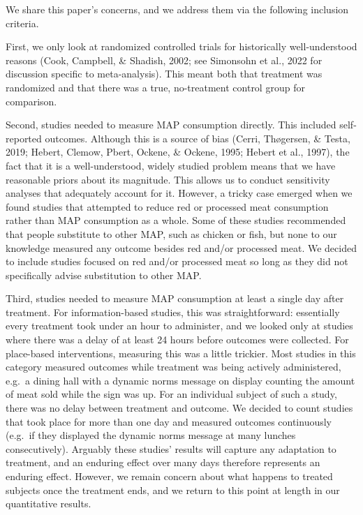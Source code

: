 \documentclass[
  man]{apa6}
\begin{document}
We share this paper's concerns, and we address them via the following inclusion criteria.

First, we only look at randomized controlled trials for historically well-understood reasons (Cook, Campbell, \& Shadish, 2002; see Simonsohn et al., 2022 for discussion specific to meta-analysis). This meant both that treatment was randomized and that there was a true, no-treatment control group for comparison.

Second, studies needed to measure MAP consumption directly. This included self-reported outcomes. Although this is a source of bias (Cerri, Thøgersen, \& Testa, 2019; Hebert, Clemow, Pbert, Ockene, \& Ockene, 1995; Hebert et al., 1997), the fact that it is a well-understood, widely studied problem means that we have reasonable priors about its magnitude. This allows us to conduct sensitivity analyses that adequately account for it. However, a tricky case emerged when we found studies that attempted to reduce red or processed meat consumption rather than MAP consumption as a whole. Some of these studies recommended that people substitute to other MAP, such as chicken or fish, but none to our knowledge measured any outcome besides red and/or processed meat. We decided to include studies focused on red and/or processed meat so long as they did not specifically advise substitution to other MAP.

Third, studies needed to measure MAP consumption at least a single day after treatment. For information-based studies, this was straightforward: essentially every treatment took under an hour to administer, and we looked only at studies where there was a delay of at least 24 hours before outcomes were collected. For place-based interventions, measuring this was a little trickier. Most studies in this category measured outcomes while treatment was being actively administered, e.g.~a dining hall with a dynamic norms message on display counting the amount of meat sold while the sign was up. For an individual subject of such a study, there was no delay between treatment and outcome. We decided to count studies that took place for more than one day and measured outcomes continuously (e.g.~if they displayed the dynamic norms message at many lunches consecutively). Arguably these studies' results will capture any adaptation to treatment, and an enduring effect over many days therefore represents an enduring effect. However, we remain concern about what happens to treated subjects once the treatment ends, and we return to this point at length in our quantitative results.
\end{document}

